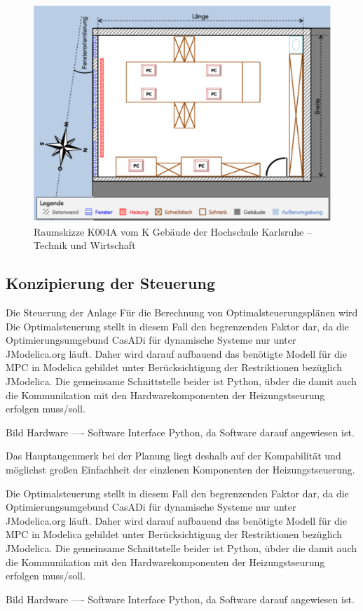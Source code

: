 \begin{figure}
\centering
\includegraphics[width=\textwidth]{abbildungen/20150102_k004a}
\caption[Raumskizze K004A vom K Gebäude der Hochschule Karlsruhe -- Technik und Wirtschaft]{Raumskizze K004A vom K Gebäude der Hochschule Karlsruhe -- Technik und Wirtschaft}
\label{fig:skizzek004a}
\end{figure}

\subsection{Konzipierung der Steuerung}
Die Steuerung der Anlage 
Für die Berechnung von Optimalsteuerungsplänen wird 
Die Optimalsteuerung stellt in diesem Fall den begrenzenden Faktor dar, da die Optimierungsumgebund CasADi für dynamische Systeme nur unter JModelica.org läuft. Daher wird darauf aufbauend das benötigte Modell für die MPC in Modelica gebildet unter Berücksichtigung der Restriktionen bezüglich JModelica. Die gemeinsame Schnittstelle beider ist Python, übder die damit auch die Kommunikation mit den Hardwarekomponenten der Heizungstseurung erfolgen muss/soll.

Bild Hardware ---- Software   Interface Python, da Software darauf angewiesen ist.



Das Hauptaugenmerk bei der Planung liegt deshalb auf der Kompabilität und möglichst großen Einfachheit der einzlenen Komponenten der Heizungstseuerung. 

Die Optimalsteuerung stellt in diesem Fall den begrenzenden Faktor dar, da die Optimierungsumgebund CasADi für dynamische Systeme nur unter JModelica.org läuft. Daher wird darauf aufbauend das benötigte Modell für die MPC in Modelica gebildet unter Berücksichtigung der Restriktionen bezüglich JModelica. Die gemeinsame Schnittstelle beider ist Python, übder die damit auch die Kommunikation mit den Hardwarekomponenten der Heizungstseurung erfolgen muss/soll.

Bild Hardware ---- Software   Interface Python, da Software darauf angewiesen ist.


